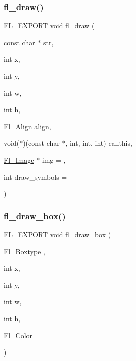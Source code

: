 \mbox{\label{group__fl__drawings_ga21d4007e0096cfa9c9906ebb373fa8ee}} 
\subsubsection{\texorpdfstring{fl\+\_\+draw()}{fl\_draw()}\hspace{0.1cm}{\footnotesize\ttfamily [6/6]}}
{\footnotesize\ttfamily \hyperlink{_fl___export_8_h_aa9ba29a18aee9d738370a06eeb4470fc}{F\+L\+\_\+\+E\+X\+P\+O\+RT} void fl\+\_\+draw (\begin{DoxyParamCaption}\item[{const char $\ast$}]{str,  }\item[{int}]{x,  }\item[{int}]{y,  }\item[{int}]{w,  }\item[{int}]{h,  }\item[{\hyperlink{_enumerations_8_h_a44e8bcd1e030e65e4f88cbae64a7c3e3}{Fl\+\_\+\+Align}}]{align,  }\item[{void($\ast$)(const char $\ast$, int, int, int)}]{callthis,  }\item[{\hyperlink{class_fl___image}{Fl\+\_\+\+Image} $\ast$}]{img = {},  }\item[{int}]{draw\+\_\+symbols = {} }\end{DoxyParamCaption})}

\mbox{\label{group__fl__drawings_ga475ff2bbcafeb30d4551f635e42d6259}} 
\subsubsection{\texorpdfstring{fl\+\_\+draw\+\_\+box()}{fl\_draw\_box()}}
{\footnotesize\ttfamily \hyperlink{_fl___export_8_h_aa9ba29a18aee9d738370a06eeb4470fc}{F\+L\+\_\+\+E\+X\+P\+O\+RT} void fl\+\_\+draw\+\_\+box (\begin{DoxyParamCaption}\item[{\hyperlink{_enumerations_8_h_ae48bf9070f8541de17829f54ccacc6bc}{Fl\+\_\+\+Boxtype}}]{,  }\item[{int}]{x,  }\item[{int}]{y,  }\item[{int}]{w,  }\item[{int}]{h,  }\item[{\hyperlink{_enumerations_8_h_a8b762953646f8abee866061f1af78a6a}{Fl\+\_\+\+Color}}]{ }\end{DoxyParamCaption})}

